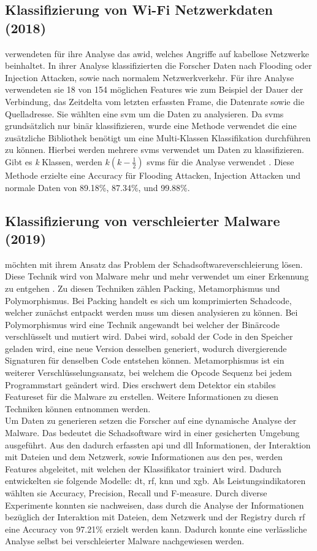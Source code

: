 \documentclass[
    12pt, %
    DIV10,
    ngerman, %
    a4paper, %
    oneside, %
    titlepage, %
    parskip=half, %
    headings=normal, %
    listof=totoc, %
    bibliography=totoc, %
    index=totoc, %
    captions=tableheading, %
    final %
]{scrreprt}
\begin{document}
\subsection{Klassifizierung von Wi-Fi Netzwerkdaten (2018)}
\textcite{Qin2018} verwendeten für ihre Analyse das \ac{awid}, welches Angriffe auf kabellose Netzwerke beinhaltet. In ihrer Analyse klassifizierten die Forscher Daten nach Flooding oder Injection Attacken, sowie nach normalem Netzwerkverkehr. Für ihre Analyse verwendeten sie 18 von 154 möglichen Features wie zum Beispiel der Dauer der Verbindung, das Zeitdelta vom letzten erfassten Frame, die Datenrate sowie die Quelladresse. Sie wählten eine \ac{svm} um die Daten zu analysieren. Da \acs{svms} grundsätzlich nur binär klassifizieren, wurde eine Methode verwendet die eine zusätzliche Bibliothek benötigt um eine Multi-Klassen Klassifikation durchführen zu können. Hierbei werden mehrere \ac{svms} verwendet um Daten zu klassifizieren. Gibt es \emph{k} Klassen, werden \(k(k-\frac{1}{2})\) \ac{svms} für die Analyse verwendet \parencite{Qin2018}. Diese Methode erzielte eine Accuracy für Flooding Attacken, Injection Attacken und normale Daten von 89.18\%, 87.34\%, und
99.88\%.
%
%
\subsection{Klassifizierung von verschleierter Malware (2019)}
\textcite{Han2019} möchten mit ihrem Ansatz das Problem der Schadsoftwareverschleierung lösen. Diese Technik wird von Malware mehr und mehr verwendet um einer Erkennung zu entgehen \parencite{li2016facial}. Zu diesen Techniken zählen Packing, Metamorphismus und Polymorphismus. Bei Packing handelt es sich um komprimierten Schadcode, welcher zunächst entpackt werden muss um diesen analysieren zu können. Bei Polymorphismus wird eine Technik angewandt bei welcher der Binärcode verschlüsselt und mutiert wird. Dabei wird, sobald der Code in den Speicher geladen wird, eine neue Version desselben generiert, wodurch divergierende Signaturen für denselben Code entstehen können. Metamorphismus ist ein weiterer Verschlüsselungsansatz, bei welchem die Opcode Sequenz bei jedem Programmstart geändert wird. Dies erschwert dem Detektor ein stabiles Featureset für die Malware zu erstellen. Weitere Informationen zu diesen Techniken können \textcite{he2017model} entnommen werden.\\
Um Daten zu generieren setzen die Forscher auf eine dynamische Analyse der Malware. Das bedeutet die Schadsoftware wird in einer gesicherten Umgebung ausgeführt. Aus den dadurch erfassten \ac{api} und \ac{dll} Informationen, der Interaktion mit Dateien und dem Netzwerk, sowie Informationen aus den \ac{pes}, werden Features abgeleitet, mit welchen der Klassifikator trainiert wird. Dadurch entwickelten sie folgende Modelle: \ac{dt}, \ac{rf}, \ac{knn} und \ac{xgb}. Als Leistungsindikatoren wählten sie Accuracy, Precision, Recall und F-measure. Durch diverse Experimente konnten sie nachweisen, dass durch die Analyse der Informationen bezüglich der Interaktion mit Dateien, dem Netzwerk und der Registry durch \ac{rf} eine Accuracy von 97.21\% erzielt werden kann. Dadurch konnte eine verlässliche Analyse selbst bei verschleierter Malware nachgewiesen werden. 
\end{document}
